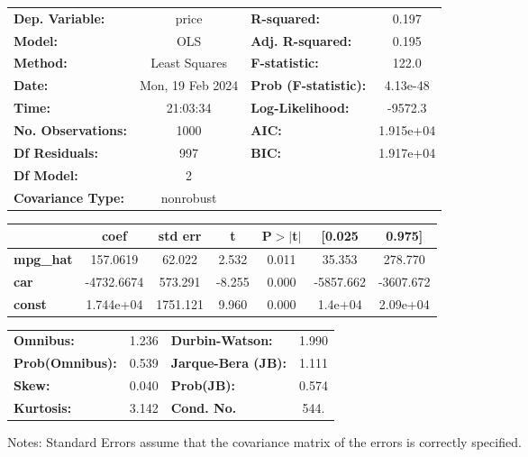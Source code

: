 \begin{center}
\begin{tabular}{lclc}
\toprule
\textbf{Dep. Variable:}    &      price       & \textbf{  R-squared:         } &     0.197   \\
\textbf{Model:}            &       OLS        & \textbf{  Adj. R-squared:    } &     0.195   \\
\textbf{Method:}           &  Least Squares   & \textbf{  F-statistic:       } &     122.0   \\
\textbf{Date:}             & Mon, 19 Feb 2024 & \textbf{  Prob (F-statistic):} &  4.13e-48   \\
\textbf{Time:}             &     21:03:34     & \textbf{  Log-Likelihood:    } &   -9572.3   \\
\textbf{No. Observations:} &        1000      & \textbf{  AIC:               } & 1.915e+04   \\
\textbf{Df Residuals:}     &         997      & \textbf{  BIC:               } & 1.917e+04   \\
\textbf{Df Model:}         &           2      & \textbf{                     } &             \\
\textbf{Covariance Type:}  &    nonrobust     & \textbf{                     } &             \\
\bottomrule
\end{tabular}
\begin{tabular}{lcccccc}
                  & \textbf{coef} & \textbf{std err} & \textbf{t} & \textbf{P$> |$t$|$} & \textbf{[0.025} & \textbf{0.975]}  \\
\midrule
\textbf{mpg\_hat} &     157.0619  &       62.022     &     2.532  &         0.011        &       35.353    &      278.770     \\
\textbf{car}      &   -4732.6674  &      573.291     &    -8.255  &         0.000        &    -5857.662    &    -3607.672     \\
\textbf{const}    &    1.744e+04  &     1751.121     &     9.960  &         0.000        &      1.4e+04    &     2.09e+04     \\
\bottomrule
\end{tabular}
\begin{tabular}{lclc}
\textbf{Omnibus:}       &  1.236 & \textbf{  Durbin-Watson:     } &    1.990  \\
\textbf{Prob(Omnibus):} &  0.539 & \textbf{  Jarque-Bera (JB):  } &    1.111  \\
\textbf{Skew:}          &  0.040 & \textbf{  Prob(JB):          } &    0.574  \\
\textbf{Kurtosis:}      &  3.142 & \textbf{  Cond. No.          } &     544.  \\
\bottomrule
\end{tabular}
\end{center}

Notes: \newline
 [1] Standard Errors assume that the covariance matrix of the errors is correctly specified.